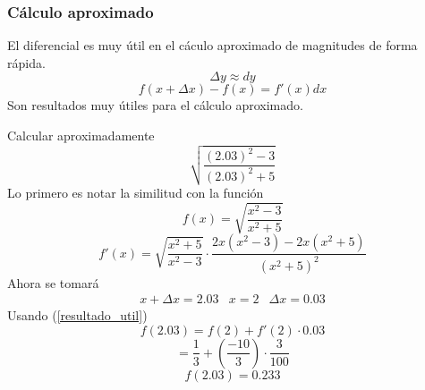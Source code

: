 \documentclass[10pt,twoside]{SelfArx} %
\begin{document}
  \subsubsection{C\'alculo aproximado}
  El diferencial es muy útil en el cáculo aproximado de magnitudes de forma rápida.
  \begin{equation}
  \Delta y\approx dy
  \end{equation}
  \begin{equation}
  f(x+\Delta x)-f(x)=f'(x)dx\label{resultado_util}
  \end{equation}
  Son resultados muy \'utiles para el c\'alculo aproximado.
  \begin{ejemplo}
  	Calcular aproximadamente\\
  	\[ \sqrt{\dfrac{(2.03)^{2}-3}{(2.03)^{2}+5}} \]
  	Lo primero es notar la similitud con la funci\'on 
\[ f(x)=\sqrt{\dfrac{x^{2}-3}{x^{2}+5}} \]
\begin{equation}
f'(x)=\sqrt{\dfrac{x^{2}+5}{x^{2}-3}}\cdot\dfrac{2x(x^{2}-3)-2x(x^{2}+5)}{(x^{2}+5)^{2}}
\end{equation}
Ahora se tomar\'a
\[ 
\begin{array}{lll}
x+\Delta x=2.03 & x=2 & \Delta x= 0.03
\end{array}
 \]
 Usando (\ref{resultado_util})
 \begin{equation}
 f(2.03)=f(2)+f'(2)\cdot0.03
 \end{equation}
 \begin{equation}
 =\dfrac{1}{3}+\left (\dfrac{-10}{3}\right )\cdot\dfrac{3}{100}
 \end{equation}
 \begin{equation}
 f(2.03)=0.233
 \end{equation}
  \end{ejemplo}
  
\end{document}

